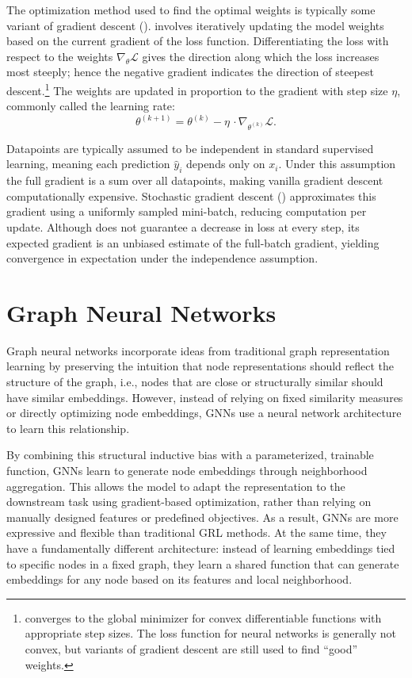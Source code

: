 The optimization method used to find the optimal weights is typically some variant of
gradient descent ().  involves iteratively updating the model
weights based on the current gradient of the loss function. Differentiating the loss
with respect to the weights $\nabla_{\theta} \mathcal{L}$ gives the direction along
which the loss increases most steeply; hence the negative gradient indicates the
direction of steepest descent.\footnote{%
     converges to the global minimizer for convex differentiable functions
    with appropriate step sizes. The loss function for neural networks is generally
    not convex, but variants of gradient descent are still used to find ``good''
    weights.}
The weights are updated in proportion to the gradient with step size $\eta$, commonly
called the learning rate:
\[
\theta^{(k+1)} = \theta^{(k)} - \eta \, \cdot \nabla_{\theta^{(k)}} \mathcal{L}.
\]

Datapoints are typically assumed to be independent in standard supervised learning,
meaning each prediction $\hat{y}_i$ depends only on $x_i$. Under this assumption the
full gradient is a sum over all datapoints, making vanilla gradient descent
computationally expensive. Stochastic gradient descent () approximates
this gradient using a uniformly sampled mini-batch, reducing computation per update.
Although  does not guarantee a decrease in loss at every step, its
expected gradient is an unbiased estimate of the full-batch gradient, yielding
convergence in expectation under the independence assumption.

\section{Graph Neural Networks}\label{sec:gnns}


Graph neural networks incorporate ideas from traditional graph representation learning by preserving the intuition that node representations should reflect the structure of the graph, i.e., nodes that are close or structurally similar should have similar embeddings. However, instead of relying on fixed similarity measures or directly optimizing node embeddings, GNNs use a neural network architecture to learn this relationship.

By combining this structural inductive bias with a parameterized, trainable function, GNNs learn to generate node embeddings through neighborhood aggregation. This allows the model to adapt the representation to the downstream task using gradient-based optimization, rather than relying on manually designed features or predefined objectives. As a result, GNNs are more expressive and flexible than traditional GRL methods. At the same time, they have a fundamentally different architecture: instead of learning embeddings tied to specific nodes in a fixed graph, they learn a shared function that can generate embeddings for any node based on its features and local neighborhood.


